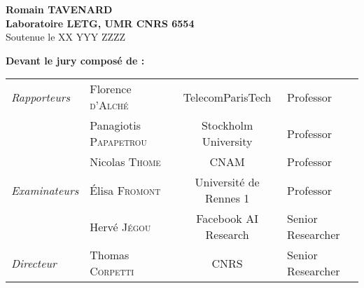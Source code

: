 \begin{titlepage}
\begin{center}
\vspace*{1.5cm}
\noindent \LARGE  \textbf{ Romain T{\Large AVENARD}} \\
\vspace*{1cm}\rmfamily
 \noindent \large \textbf{  Laboratoire LETG, UMR CNRS 6554 } \\
 \vspace*{2cm}
 \noindent \large Soutenue le XX YYY ZZZZ \\
 \vspace*{1cm}
\end{center}
\noindent \large \textbf{Devant le jury composé de :} \\
\begin{center}
\noindent \large
\begin{tabular}{llcl}
      \textit{Rapporteurs}	& Florence {\scshape d'Alché} & TelecomParisTech & Professor\\
                                & Panagiotis {\scshape Papapetrou} & Stockholm University & Professor\\
                                & Nicolas {\scshape Thome} & CNAM & Professor\\
      \textit{Examinateurs}   & Élisa {\scshape Fromont} & Université de Rennes 1 & Professor\\
                                & Hervé {\scshape Jégou} & Facebook AI Research & Senior Researcher\\
      \textit{Directeur}	    & Thomas {\scshape Corpetti} & CNRS & Senior Researcher\\

\end{tabular}
 \end{center}
\end{titlepage}
\sloppy

\titlepage

